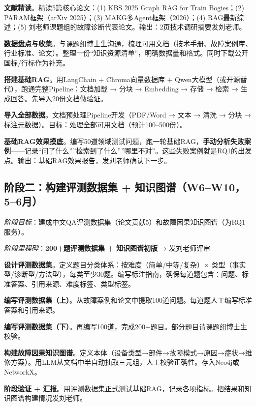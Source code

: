 \documentclass[a4paper, 11pt]{ctexart}
\begin{document}
\begin{description}[style=nextline, leftmargin=1.2cm, labelwidth=1cm, font=\bfseries\color{tsinghua}]
\item[W1] \textbf{文献精读}。精读5篇核心论文：(1) KBS 2025 Graph RAG for Train Bogies；(2) PARAM框架（arXiv 2025）；(3) MAKG多Agent框架（2026）；(4) RAG最新综述；(5) 刘老师课题组的故障诊断代表论文。输出：2页技术调研摘要发刘老师。
\item[W2] \textbf{数据盘点与收集}。与课题组博士生沟通，梳理可用文档（技术手册、故障案例库、行业标准、论文）。整理一份``知识资源清单''，明确数据量和格式。同时下载公开国标/行标作为补充。
\item[W3] \textbf{搭建基础RAG}。用LangChain + Chroma向量数据库 + Qwen大模型（或开源替代），跑通完整Pipeline：文档加载 → 分块 → Embedding → 存储 → 检索 → 生成回答。先导入20份文档做验证。
\item[W4] \textbf{导入全部数据}。文档预处理Pipeline开发（PDF/Word → 文本 → 清洗 → 分块 → 标注元数据）。目标：处理全部可用文档（预计100--500份）。
\item[W5] \textbf{基础RAG效果摸底}。编写50道领域测试问题，跑一轮基础RAG，\textbf{手动分析失败案例}——记录``问了什么''''检索到了什么''''哪里不对''。这些失败案例就是RQ1的出发点。输出：基础RAG效果报告，发刘老师确认下一步。
\end{description}

\subsection{阶段二：构建评测数据集 + 知识图谱（W6--W10，5--6月）}

\noindent\textit{阶段目标}：建成中文QA评测数据集（论文贡献5）和故障因果知识图谱（为RQ1服务）。

\noindent\textit{阶段里程碑}：{\color{tsinghua}\textbf{200+题评测数据集 + 知识图谱初版} → 发刘老师评审}

\begin{description}[style=nextline, leftmargin=1.2cm, labelwidth=1cm, font=\bfseries\color{tsinghua}]
\item[W6] \textbf{设计评测数据集}。定义题目分类体系：按难度（简单/中等/复杂）$\times$ 类型（事实型/诊断型/方法型），每类至少30题。编写标注指南，确保每道题包含：问题、标准答案、引用来源、难度标签、类型标签。
\item[W7] \textbf{编写评测数据集（上）}。从故障案例和论文中提取100道问题。每道题人工编写标准答案和引用来源。
\item[W8] \textbf{编写评测数据集（下）}。再编写100道，完成200+题目。部分题目请课题组博士生校验。
\item[W9] \textbf{构建故障因果知识图谱}。定义本体（设备类型→部件→故障模式→原因→症状→维修方案）。用LLM从文档中半自动抽取三元组，人工校验正确性。存入Neo4j或NetworkX。
\item[W10] \textbf{阶段验证 + 汇报}。用评测数据集正式测试基础RAG，记录各项指标。把结果和知识图谱构建情况发刘老师。
\end{description}
\end{document}
